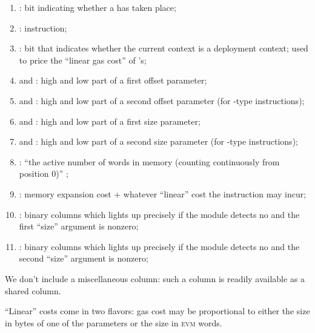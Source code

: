 \begin{enumerate}[resume]
	\item \miscMxpMxpx{}:
		bit indicating whether a \mxpxSH{} has taken place;
	\item \miscMxpInst{}:
		\mxpMod{} instruction; 
	\item \miscMxpCodeDeployment{}:
		bit that indicates whether the current context is a deployment context; used to price the ``linear gas cost'' of 's;
	\item \miscMxpOffsetOneHi{} and \miscMxpOffsetOneLo{}:
		high and low part of a first offset parameter;
	\item \miscMxpOffsetTwoHi{} and \miscMxpOffsetTwoLo{}:
		high and low part of a second offset parameter (for -type instructions);
	\item \miscMxpSizeOneHi{} and \miscMxpSizeOneLo{}:
		high and low part of a first size parameter;
	\item \miscMxpSizeTwoHi{} and \miscMxpSizeTwoLo{}:
		high and low part of a second size parameter (for -type instructions);
	\item \miscMxpWords{}:
		``the active number of words in memory (counting continuously from position $0$)'' ;
	\item \miscMxpGasMxp{}:
		memory expansion cost + whatever ``linear'' cost the instruction may incur;
	\item \miscMxpSizeOneNonzeroNoMxpx{}:
		binary columns which lights up precisely if the \mxpMod{} module detects no \mxpxSH{} and the first ``size'' argument is nonzero;
	\item \miscMxpSizeTwoNonzeroNoMxpx{}:
		binary columns which lights up precisely if the \mxpMod{} module detects no \mxpxSH{} and the second ``size'' argument is nonzero;
\end{enumerate}
\saNote{} We don't include a miscellaneous \mxpStamp{} column: such a column is readily available as a shared column.

\saNote{} ``Linear'' costs come in two flavors: gas cost may be proportional to either the size in bytes of one of the parameters or the size in \textsc{evm} words.
